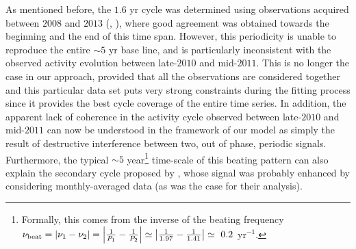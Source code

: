 \documentclass[a4paper,fleqn,usenatbib]{mnras}
\begin{document}
As mentioned before, the $1.6$ yr cycle was determined using observations acquired between $2008$ and $2013$ (, ), where good agreement was obtained towards the beginning and the end of this time span. However, this periodicity is unable to reproduce the entire $\sim$$5$ yr base line, and is particularly inconsistent with the observed activity evolution between late-$2010$ and mid-$2011$. This is no longer the case in our approach, provided that all the observations are considered together and this particular data set puts very strong constraints during the fitting process since it provides the best cycle coverage of the entire time series. In addition, the apparent lack of coherence in the activity cycle observed between late-$2010$ and mid-$2011$ can now be understood in the framework of our model as simply the result of destructive interference between two, out of phase, periodic signals. Furthermore, the typical $\sim$$5$ year\footnote[10]{Formally, this comes from the inverse of the beating frequency $\nu_{\rm beat} = \left|\nu_1 - \nu_2\right| = \left| \frac{1}{P_{1}} - \frac{1}{P_{2}}\right| \simeq \left| \frac{1}{1.97} - \frac{1}{1.41}\right| \simeq~0.2$ yr$^{-1}$.} time-scale of this beating pattern can also explain the secondary cycle proposed by , whose signal was probably enhanced by considering monthly-averaged data (as was the case for their analysis). %
\end{document}
